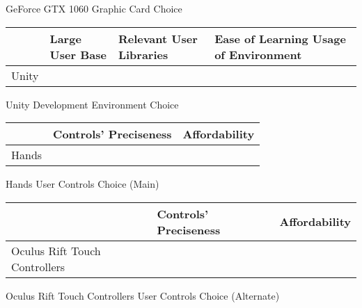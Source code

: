 \documentclass[letterpaper,10pt,onecolumn,compsoc]{IEEEtran}
\begin{document}
\begin{center}
GeForce GTX 1060 Graphic Card Choice
\end{center}

\begin{center}
\begin{tabular}{ | P{3.375cm} | P{2.5cm} | P{3.5cm} | P{6.375cm} | } 
 	\hline
 	 & Large User Base & Relevant User Libraries & Ease of Learning Usage of Environment \\ 
 	\hline 		
 	Unity & \checkmark & \checkmark & \checkmark \\ 
 	\hline
\end{tabular}
\end{center}

\begin{center}
Unity Development Environment Choice
\end{center}

\begin{center}
\begin{tabular}{ | P{7.125cm} | P{3.5cm} | P{5.125cm} | } 
 	\hline
 	 & Controls' Preciseness & Affordability \\ 
 	\hline 		
 	Hands & \checkmark & \checkmark \\ 
 	\hline
\end{tabular}
\end{center}

\begin{center}
Hands User Controls Choice (Main)
\end{center}

\begin{center}
\begin{tabular}{ | P{7.125cm} | P{3.5cm} | P{5.125cm} | } 
 	\hline
 	 & Controls' Preciseness & Affordability \\ 
 	\hline 		
 	Oculus Rift Touch Controllers & \checkmark & \checkmark \\ 
 	\hline
\end{tabular}
\end{center}

\begin{center}
Oculus Rift Touch Controllers User Controls Choice (Alternate)
\end{center}

\newpage

\end{document}
